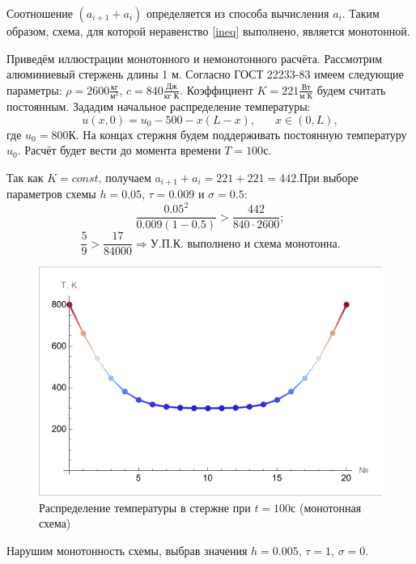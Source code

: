 \documentclass[12pt, a4paper]{article}
\begin{document}
Соотношение $(a_{i+1}+a_i)$ определяется из способа вычисления $a_i$. Таким образом, схема, для которой неравенство \eqref{ineq} выполнено, является монотонной.

Приведём иллюстрации монотонного и немонотонного расчёта. Рассмотрим алюминиевый стержень длины 1 м. Согласно ГОСТ 22233-83 имеем следующие параметры: $\rho = 2600\frac{\text{кг}}{\text{м}^3}$, $c = 840 \frac{\text{Дж}}{\text{кг К}}$. Коэффициент $K = 221\frac{\text{Вт}}{\text{м К}}$ будем считать постоянным. Зададим начальное распределение температуры:
\[
u(x, 0) = u_0-500-x(L-x), \phantom{xxx} x\in(0, L),
\]
где $u_0=800$К. На концах стержня будем поддерживать постоянную температуру $u_0$. Расчёт будет вести до момента времени $T=100$с. 

Так как $K=const$, получаем $a_{i+1}+a_i = 221 + 221 = 442$.При выборе параметров схемы $h=0.05$, $\tau = 0.009$ и $\sigma = 0.5$:
\[
\dfrac{0.05^2}{0.009(1-0.5)} > \dfrac{442}{840\cdot 2600};
\]
\[
\dfrac59 > \frac{17}{84000} \Rightarrow \text{У.П.К. выполнено и схема монотонна}.
\]

 \begin{figure}[H]
	\centering
	\includegraphics[width=1\textwidth]{monotExample}
	\caption{Распределение температуры в стержне при \mbox{$t=100$с} (монотонная схема)}
\end{figure}

Нарушим монотонность схемы, выбрав значения $h=0.005$, $\tau = 1$, $\sigma = 0$.
\end{document}
